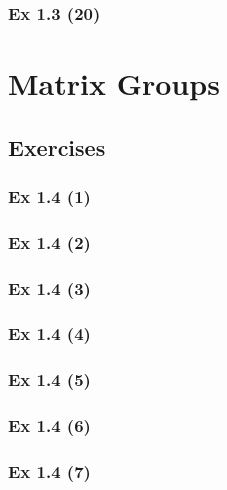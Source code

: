 \subsubsection{Ex 1.3 (20)}\label{sec:Ex_1.3.20}

\newpage		%

\section{Matrix Groups}\label{sec:1.4}
\subsection*{Exercises}\label{sec:1.4_Exercises}

\subsubsection{Ex 1.4 (1)}\label{sec:Ex_1.4.1}

\subsubsection{Ex 1.4 (2)}\label{sec:Ex_1.4.2}

\subsubsection{Ex 1.4 (3)}\label{sec:Ex_1.4.3}

\subsubsection{Ex 1.4 (4)}\label{sec:Ex_1.4.4}

\subsubsection{Ex 1.4 (5)}\label{sec:Ex_1.4.5}

\subsubsection{Ex 1.4 (6)}\label{sec:Ex_1.4.6}

\subsubsection{Ex 1.4 (7)}\label{sec:Ex_1.4.7}


